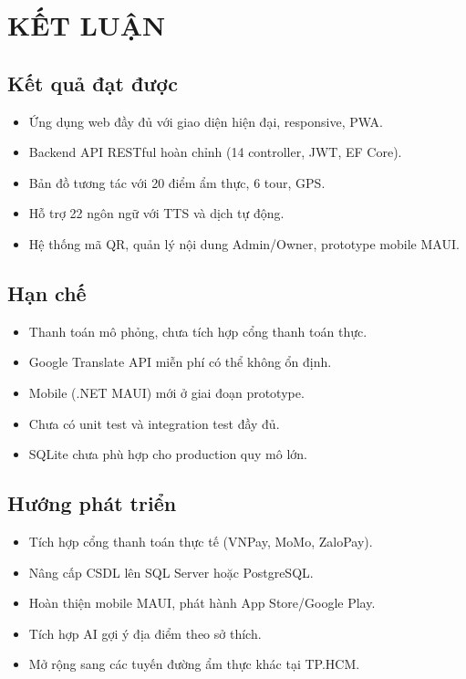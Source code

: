 \documentclass[a4paper,13pt]{report}
\begin{document}
\chapter{KẾT LUẬN}

\section{Kết quả đạt được}

\begin{itemize}[nosep]
  \item Ứng dụng web đầy đủ với giao diện hiện đại, responsive, PWA.
  \item Backend API RESTful hoàn chỉnh (14 controller, JWT, EF Core).
  \item Bản đồ tương tác với 20 điểm ẩm thực, 6 tour, GPS.
  \item Hỗ trợ 22 ngôn ngữ với TTS và dịch tự động.
  \item Hệ thống mã QR, quản lý nội dung Admin/Owner, prototype mobile MAUI.
\end{itemize}

\section{Hạn chế}

\begin{itemize}[nosep]
  \item Thanh toán mô phỏng, chưa tích hợp cổng thanh toán thực.
  \item Google Translate API miễn phí có thể không ổn định.
  \item Mobile (.NET MAUI) mới ở giai đoạn prototype.
  \item Chưa có unit test và integration test đầy đủ.
  \item SQLite chưa phù hợp cho production quy mô lớn.
\end{itemize}

\section{Hướng phát triển}

\begin{itemize}[nosep]
  \item Tích hợp cổng thanh toán thực tế (VNPay, MoMo, ZaloPay).
  \item Nâng cấp CSDL lên SQL Server hoặc PostgreSQL.
  \item Hoàn thiện mobile MAUI, phát hành App Store/Google Play.
  \item Tích hợp AI gợi ý địa điểm theo sở thích.
  \item Mở rộng sang các tuyến đường ẩm thực khác tại TP.HCM.
\end{itemize}
\end{document}
